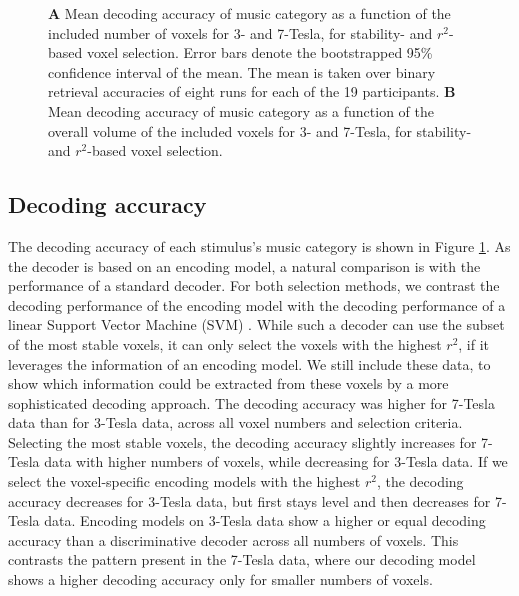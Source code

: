 \begin{figure}
  \centering
  \def\svgwidth{\linewidth}
  
	
  \caption{\textbf{A} Mean decoding accuracy of music category as a function of
  the included number of voxels for 3- and 7-Tesla, for stability- and
  $r^2$-based voxel selection. Error bars denote the bootstrapped 95\%
  confidence interval of the mean. The mean is taken over binary retrieval
  accuracies of eight runs for each of the 19 participants. \textbf{B} Mean
decoding accuracy of music category as a function of the overall volume of the
included voxels for 3- and 7-Tesla, for stability- and $r^2$-based voxel
selection.}

 \label{fig:decoding_accuracy}
\end{figure}


\subsection*{Decoding accuracy}

The decoding accuracy of each stimulus's music category is shown in Figure
\ref{fig:decoding_accuracy}. As the decoder is based on an encoding model, a
natural comparison is with the performance of a standard decoder. For both
selection methods, we contrast the decoding performance of the encoding model
with the decoding performance of a linear Support Vector Machine (SVM)
\citep{FCH+08,V13}. While such a decoder can use the subset of the most stable
voxels, it can only select the voxels with the highest $r^2$, if it leverages
the information of an encoding model. We still include these data, to show
which information could be extracted from these voxels by a more sophisticated
decoding approach.  The decoding accuracy was higher for 7-Tesla data than for
3-Tesla data, across all voxel numbers and selection criteria.  Selecting the
most stable voxels, the decoding accuracy slightly increases for 7-Tesla data
with higher numbers of voxels, while decreasing for 3-Tesla data.  If we select
the voxel-specific encoding models with the highest $r^2$, the decoding
accuracy decreases for 3-Tesla data, but first stays level and then decreases
for 7-Tesla data. Encoding models on 3-Tesla data show a higher or equal
decoding accuracy than a discriminative decoder across all numbers of voxels.
This contrasts the pattern present in the 7-Tesla data, where our decoding
model shows a higher decoding accuracy only for smaller numbers of voxels.

